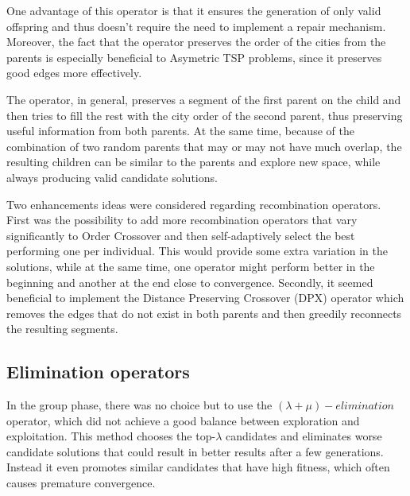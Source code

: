 \documentclass[a4paper,10pt]{article}
\newcommand{\ReplaceMe}[1]{{\color{blue}#1}}
\begin{document}
One advantage of this operator is that it ensures the generation of only valid offspring and thus doesn't require the need to implement a repair mechanism. Moreover, the fact that the operator preserves the order of the cities from the parents is especially beneficial to Asymetric TSP problems, since it preserves good edges more effectively.

The operator, in general, preserves a segment of the first parent on the child and then tries to fill the rest with the city order of the second parent, thus preserving useful information from both parents. At the same time, because of the combination of two random parents that may or may not have much overlap, the resulting children can be similar to the parents and explore new space, while always producing valid candidate solutions.

Two enhancements ideas were considered regarding recombination operators. First was the possibility to add more recombination operators that vary significantly to Order Crossover and then self-adaptively select the best performing one per individual. This would provide some extra variation in the solutions, while at the same time, one operator might perform better in the beginning and another at the end close to convergence. Secondly, it seemed beneficial to implement the Distance Preserving Crossover (DPX) operator \cite{dpx} which removes the edges that do not exist in both parents and then greedily reconnects the resulting segments.

\subsection{Elimination operators} \label{ss:elimination}


In the group phase, there was no choice but to use the $(\lambda+\mu)-elimination$ operator, which did not achieve a good balance between exploration and exploitation. This method chooses the top-$\lambda$ candidates and eliminates worse candidate solutions that could result in better results after a few generations. Instead it even promotes similar candidates that have high fitness, which often causes premature convergence.
\end{document}
